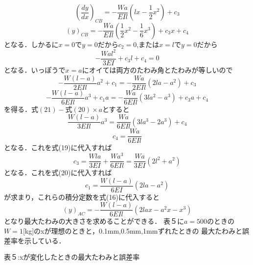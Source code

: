 \documentclass[a4paper,11pt]{jsarticle}
\begin{document}
\begin{enumerate}
\begin{equation}
          {(\dfrac{dy}{dx})_{CB}}={-\dfrac{Wa}{EIl}(lx-\dfrac{1}{2}x^2)+c_3}
        \end{equation}
        \begin{equation}
          {(y)_{CB}}={-\dfrac{Wa}{EIl}(\dfrac{1}{2}x^2-\dfrac{1}{6}x^3)+c_3x+c_4}
        \end{equation}
        となる．しかるに$x=0$で$y=0$だから$c_2=0$,または$x=l$で$y=0$だから
        \begin{equation}
          {-\dfrac{Wal^2}{3EI}+c_3l+c_4}=0
        \end{equation}
        となる．いっぽうで$x=a$にオイては両方のたわみ角とたわみが等しいので
        \begin{equation}
          {-\dfrac{W(l-a)}{2EIl}a^2+c_1}={-\dfrac{Wa}{2EIl}(2la-a^2)+c_3}
        \end{equation}
        \begin{equation}
          {-\dfrac{W(l-a)}{6EIl}a^3+c_1a}={-\dfrac{Wa}{6EIl}(3la^2-a^3)+c_3a+c_4}
        \end{equation}
        を得る．$式(21)-式(20) \times a$とすると
        \begin{equation}
          {\dfrac{W(l-a)}{3EIl}a^3}={\dfrac{Wa}{6EIl}(3la^3-2a^3)+c_4}
        \end{equation}
        \begin{equation}
          c_4={\dfrac{Wa}{6EIl}}
        \end{equation}
        となる．これを式(19)に代入すれば
        \begin{equation}
          c_3={\dfrac{Wla}{3EI}+\dfrac{Wa^3}{6EIl}}={\dfrac{Wa}{3EI}(2l^2+a^2)}
        \end{equation}
        となる．これを式(20)に代入すれば
        \begin{equation}
          c_1={\dfrac{W(l-a)}{6EI}(2la-a^2)}
        \end{equation}
        が求まり，これらの積分定数を式(16)に代入すると
        \begin{equation}
          {(y)_{AC}}={-\dfrac{W(l-a)}{6EIl}(2lax-a^2x-x^3)}
        \end{equation}
        となり最大たわみの大きさを求めることができる．
        表５に$a=500$のときの$W=1$[kg]のxが理想のときと，0.1mm,0.5mm,1mmずれたときの
        最大たわみと誤差率を示している．\\
        \begin{table}[h]
          \centering
          \caption*{表５:xが変化したときの最大たわみと誤差率}
          \label{tab:表５}
          \large

\end{table}
\end{enumerate}
\end{document}
